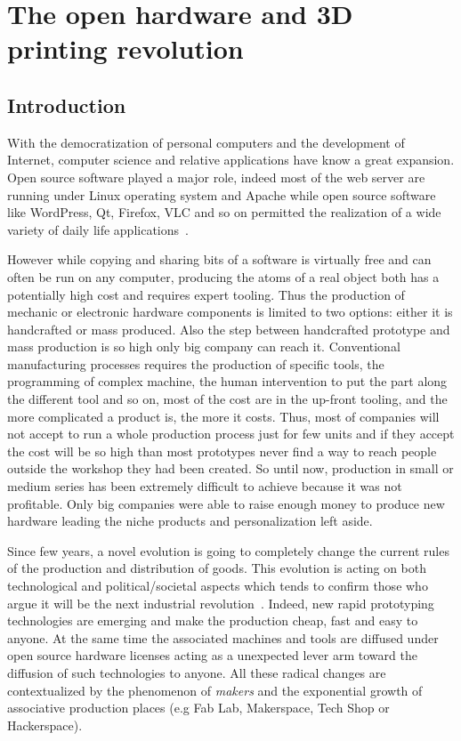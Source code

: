 
\cleartoleftpage


\chapter{The open hardware and 3D printing revolution}



\section{Introduction} %

With the democratization of personal computers and the development of Internet, computer science and relative applications have know a great expansion. Open source software played a major role, indeed most of the web server are running under Linux operating system and Apache while open source software like WordPress, Qt, Firefox, VLC and so on permitted the realization of a wide variety of daily life applications~\cite{peeling2001analysis}.

However while copying and sharing bits of a software is virtually free and can often be run on any computer, producing the atoms of a real object both has a potentially high cost and requires expert tooling. Thus the production of mechanic or electronic hardware components is limited to two options: either it is handcrafted or mass produced. Also the step between handcrafted prototype and mass production is so high only big company can reach it. Conventional manufacturing processes requires the production of specific tools, the programming of complex machine, the human intervention to put the part along the different tool and so on, most of the cost are in the up-front tooling, and the more complicated a product is, the more it costs. Thus, most of companies will not accept to run a whole production process just for few units and if they accept the cost will be so high than most prototypes never find a way to reach people outside the workshop they had been created. So until now, production in small or medium series has been extremely difficult to achieve because it was not profitable.
Only big companies were able to raise enough money to produce new hardware leading the niche products and personalization left aside.

Since few years, a novel evolution is going to completely change the current rules of the production and distribution of goods. This evolution is acting on both technological and political/societal aspects which tends to confirm those who argue it will be the next industrial revolution~\cite{anderson}. Indeed, new rapid prototyping technologies are emerging and make the production cheap, fast and easy to anyone. At the same time the associated machines and tools are diffused under open source hardware licenses acting as a unexpected lever arm toward the diffusion of such technologies to anyone. All these radical changes are contextualized by the phenomenon of \emph{makers} and the exponential growth of associative production places (e.g Fab Lab, Makerspace, Tech Shop or Hackerspace).

